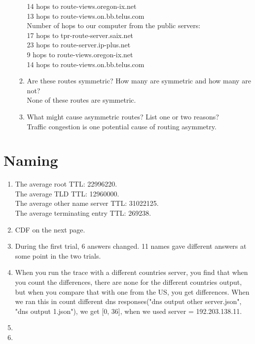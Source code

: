 \documentclass{article}
\begin{document}
\begin{enumerate}
\begin{enumerate}
    14 hops to route-views.oregon-ix.net\\
    13 hops to route-views.on.bb.telus.com\\
    Number of hops to our computer from the public servers:\\
    17 hops to tpr-route-server.saix.net\\
    23 hops to route-server.ip-plus.net\\
    9 hops to route-views.oregon-ix.net\\
    14 hops to route-views.on.bb.telus.com
    \item Are these routes symmetric? How many are symmetric and how many are not?\\
    None of these routes are symmetric.
    \item What might cause asymmetric routes? List one or two reasons? \\
    Traffic congestion is one potential cause of routing asymmetry.
    \end{enumerate}
\end{enumerate}
\section{Naming}
    \begin{enumerate}
        \item
        The average root TTL: 22996220.\\
        The average TLD TTL: 12960000.\\
        The average other name server TTL: 31022125.\\
        The average terminating entry TTL: 269238.
        \item
        CDF on the next page. 
        

        \item
        During the first trial, 6 answers changed. 11 names gave different answers at some point in the two trials.
        \item
        When you run the trace with a different countries server, you find that when you count the differences, there are none for the different countries output, but when you compare that with one from the US, you get differences. When we ran this in count different dns responses("dns output other server.json", "dns output 1.json"), we get [0, 36], when we used server = 192.203.138.11. 
        \item
        \item
    \end{enumerate}
\end{document}
